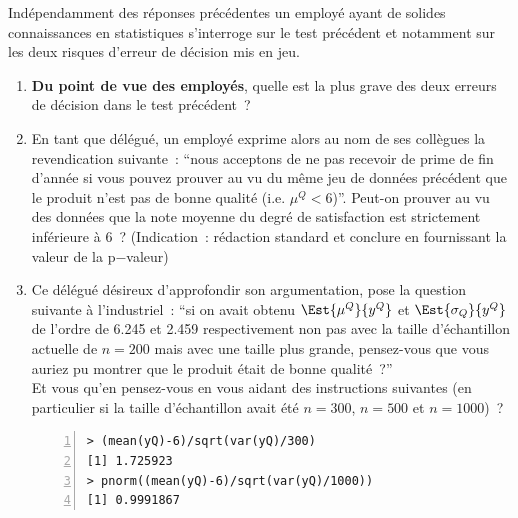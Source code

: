 \documentclass[10pt]{report}
\begin{document}
\begin{exercice}
Ind{\'e}pendamment des r{\'e}ponses pr{\'e}c{\'e}dentes un employ{\'e} ayant de solides connaissances en statistiques s'interroge sur le test pr{\'e}c{\'e}dent et notamment sur les deux risques d'erreur de d{\'e}cision mis en jeu. 

\begin{enumerate}
\item \textbf{Du point de vue des employ{\'e}s}, quelle est la plus grave des deux erreurs de d{\'e}cision dans le test pr{\'e}c{\'e}dent~?



\item En tant que d{\'e}l{\'e}gu{\'e}, un employé exprime alors au nom de ses coll{\`e}gues la revendication suivante~: ``nous acceptons de ne pas recevoir de prime de fin d'ann{\'e}e si vous pouvez prouver au vu du m{\^e}me jeu de donn{\'e}es pr{\'e}c{\'e}dent que le produit n'est pas de bonne qualit{\'e} (i.e. $\mu^Q<6$)''. Peut-on prouver au vu des donn{\'e}es que la note moyenne du degr{\'e} de satisfaction est strictement inf{\'e}rieure {\`a} 6~? (Indication~: r{\'e}daction standard et conclure en fournissant la valeur de la p$-$valeur)
 

\item Ce d{\'e}l{\'e}gu{\'e} d{\'e}sireux d'approfondir son argumentation, pose la question suivante {\`a} l'industriel~: ``si on avait obtenu $\Est{\mu^Q}{y^Q}$ et $\Est{\sigma_{Q}}{y^Q}$ de l'ordre de 6.245 et 2.459 respectivement non pas avec la taille d'{\'e}chantillon actuelle de $n=200$ mais avec une taille plus grande, pensez-vous que vous auriez pu montrer que le produit {\'e}tait de bonne qualit{\'e}~?''\\
Et vous qu'en pensez-vous en vous aidant des instructions suivantes (en particulier si la taille d'{\'e}chantillon avait {\'e}t{\'e} $n=300$, $n=500$ et $n=1000$)~?

\begin{Verbatim}[frame=leftline,fontfamily=tt,fontshape=n,numbers=left]
> (mean(yQ)-6)/sqrt(var(yQ)/300)
[1] 1.725923
> pnorm((mean(yQ)-6)/sqrt(var(yQ)/1000))
[1] 0.9991867
\end{Verbatim}


 
\end{enumerate}
\end{exercice}
\end{document}
